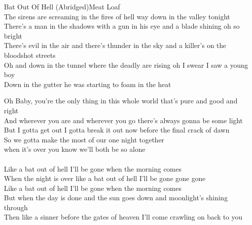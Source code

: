 \documentclass[a4paper,11pt]{article}
\begin{document}
\begin{song}{Bat Out Of Hell (Abridged)}{Meat Loaf}
 \\
The sirens are screaming in the fires of hell way down in the valley tonight\\
There's a man in the shadows with a gun in his eye and a blade shining oh so bright\\ 
There's evil in the air and there's thunder in the sky and a killer's on the bloodshot streets \\
Oh and down in the tunnel where the deadly are rising  oh I swear I saw a young boy \\
Down in the gutter he was starting to foam in the heat \\
%
\newsavebox{\fmbox}\begin{lrbox}{\fmbox}\begin{minipage}{\linewidth}
Oh Baby, you're the only thing in this whole world that's pure and good and right \\
And wherever you are and wherever you go there's always gonna be some light \\
But I gotta get out I gotta break it out now before the final crack of dawn \\ 
So we gotta make the most of our one night together \\
when it's over you know we'll both be so alone \\
\\
Like a bat out of hell I'll be gone when the morning comes \\
When the night is over like a bat out of hell I'll be gone gone gone\\ 
Like a bat out of hell I'll be gone when the morning comes\\ 
But when the day is done and the sun goes down and moonlight's shining through\\ 
Then like a sinner before the gates of heaven I'll come crawling on back to you
\end{minipage}\end{lrbox}\fbox{\usebox{\fmbox}}
\\

\end{song}
\end{document}
